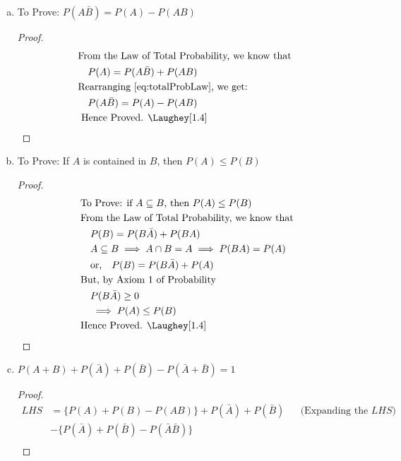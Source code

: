 \begin{enumerate}[a.]
	\item To Prove: $P(A \bar{B}) = P(A) - P(AB)$
		\!
		\begin{proof}
			\begin{align}
				& \text{From the Law of Total Probability, we know that } \nonumber\\ 
				& \quad P(A) = P(A \bar{B}) + P(AB) \label{eq:totalProbLaw} \\
				& \text{Rearranging \cref{eq:totalProbLaw}, we get:} \nonumber\\
				& \quad P(A\bar{B}) = P(A) - P(AB) \\
				& \text{ Hence Proved. \Laughey[1.4]} \nonumber
			\end{align}
		\end{proof}
	\item To Prove: If $A$ is contained in $B$, then $P(A) \leq P(B)$
		\!
		\begin{proof}
			\begin{align}
				& \text{To Prove: } \text{if } A \subseteq B \text{,  then } P(A) \leq P(B) \nonumber \\
				& \text{From the Law of Total Probability, we know that} \nonumber\\
				& \quad P(B) = P(B\bar{A}) + P(BA) \label{eq:totalProbLawB}\\
				& \quad A \subseteq B \implies A \cap B = A \implies P(BA) = P(A) \nonumber\\
				& \quad \text{or,} \quad P(B) = P(B\bar{A}) + P(A) \nonumber\\
				& \text{But, by Axiom $1$ of Probability} \nonumber\\
				& \quad P(B\bar{A}) \geq 0 \nonumber\\
				& \quad \implies P(A) \leq P(B) \nonumber \\
				& \text{Hence Proved. \Laughey[1.4]} \nonumber			
			\end{align}
		\end{proof}
		\item {} $P(A+B) + P(\bar A) + P(\bar B) - P(\bar A + \bar B) = 1$\\
		\!
			\begin{proof}
				\begin{align}
					LHS &= \{P(A) + P(B) - P(AB)\} + P(\bar{A}) + P(\bar{B}) &&\text{(Expanding the $LHS$)} \nonumber\\
					&- \{P(\bar{A}) + P(\bar{B}) - P(\bar{A}\bar{B})\}  \nonumber\\

\end{align}
\end{proof}
\end{enumerate}
